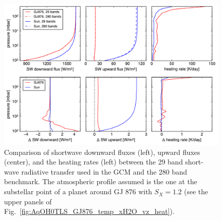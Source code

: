 \documentclass[11pt,numberedappendix,twocolappendix,]{emulateapj}
\begin{document}
\begin{figure}[!htb]
    \begin{center}
    \includegraphics[width=0.8\hsize]{fig/rad_comparison_SW29-SW280_AqOH0TLS_GJ876S12P20L40Q.pdf}
    \end{center}
\caption{Comparison of shortwave downward fluxes (left), upward fluxes (center), and the heating rates (left) between the 29 band short-wave radiative transfer used in the GCM and the 280 band benchmark. The atmospheric profile assumed is the one at the substellar point of a planet around GJ 876 with $S_X=1.2$ (see the upper panels of Fig.~\ref{fig:AqOH0TLS_GJ876_temp_xH2O_vz_heat}). }
\label{fig:socrates}
\end{figure}
\end{document}
